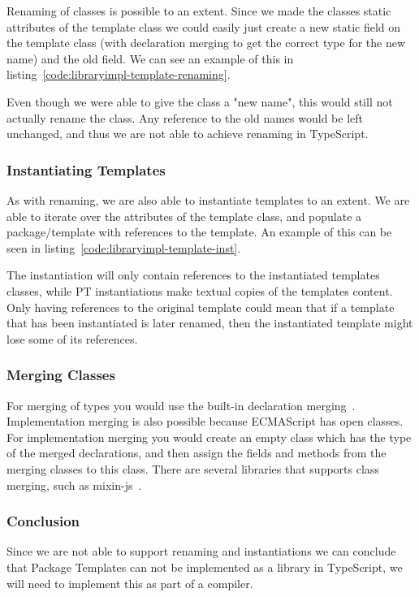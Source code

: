 Renaming of classes is possible to an extent.
Since we made the classes static attributes of the template class we could easily just create a new static field on the template class (with declaration merging to get the correct type for the new name) and \cite{deleteop} the old field.
We can see an example of this in listing~\vref{code:libraryimpl-template-renaming}.


Even though we were able to give the class a "new name", this would still not actually rename the class.
Any reference to the old names would be left unchanged, and thus we are not able to achieve renaming in TypeScript.

\subsubsection{Instantiating Templates}\label{subsubsec:instantiating-templates}

As with renaming, we are also able to instantiate templates to an extent.
We are able to iterate over the attributes of the template class, and populate a package/template with references to the template.
An example of this can be seen in listing~\vref{code:libraryimpl-template-inst}.


The instantiation will only contain references to the instantiated templates classes, while PT instantiations make textual copies of the templates content.
Only having references to the original template could mean that if a template that has been instantiated is later renamed, then the instantiated template might lose some of its references.


\subsubsection{Merging Classes}

For merging of types you would use the built-in declaration merging~\cite{declerationmerging}.
Implementation merging is also possible because ECMAScript has open classes.
For implementation merging you would create an empty class which has the type of the merged declarations, and then assign the fields and methods from the merging classes to this class.
There are several libraries that supports class merging, such as mixin-js~\cite{mixinjs}.

\subsubsection{Conclusion}

Since we are not able to support renaming and instantiations we can conclude that Package Templates can not be implemented as a library in TypeScript, we will need to implement this as part of a compiler.
